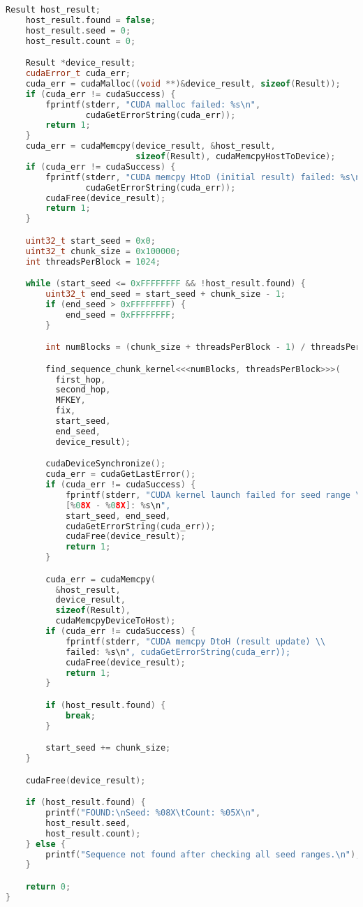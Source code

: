 \begin{lstlisting}[language=C++,basicstyle=\small,showstringspaces=false]
    Result host_result;
    host_result.found = false;
    host_result.seed = 0;
    host_result.count = 0;

    Result *device_result;
    cudaError_t cuda_err;
    cuda_err = cudaMalloc((void **)&device_result, sizeof(Result));
    if (cuda_err != cudaSuccess) {
        fprintf(stderr, "CUDA malloc failed: %s\n",
                cudaGetErrorString(cuda_err));
        return 1;
    }
    cuda_err = cudaMemcpy(device_result, &host_result,
                          sizeof(Result), cudaMemcpyHostToDevice);
    if (cuda_err != cudaSuccess) {
        fprintf(stderr, "CUDA memcpy HtoD (initial result) failed: %s\n",
                cudaGetErrorString(cuda_err));
        cudaFree(device_result);
        return 1;
    }

    uint32_t start_seed = 0x0;
    uint32_t chunk_size = 0x100000;
    int threadsPerBlock = 1024;

    while (start_seed <= 0xFFFFFFFF && !host_result.found) {
        uint32_t end_seed = start_seed + chunk_size - 1;
        if (end_seed > 0xFFFFFFFF) {
            end_seed = 0xFFFFFFFF;
        }

        int numBlocks = (chunk_size + threadsPerBlock - 1) / threadsPerBlock;

        find_sequence_chunk_kernel<<<numBlocks, threadsPerBlock>>>(
          first_hop,
          second_hop,
          MFKEY,
          fix,
          start_seed,
          end_seed,
          device_result);

        cudaDeviceSynchronize();
        cuda_err = cudaGetLastError();
        if (cuda_err != cudaSuccess) {
            fprintf(stderr, "CUDA kernel launch failed for seed range \\
            [%08X - %08X]: %s\n",
            start_seed, end_seed,
            cudaGetErrorString(cuda_err));
            cudaFree(device_result);
            return 1;
        }

        cuda_err = cudaMemcpy(
          &host_result,
          device_result,
          sizeof(Result),
          cudaMemcpyDeviceToHost);
        if (cuda_err != cudaSuccess) {
            fprintf(stderr, "CUDA memcpy DtoH (result update) \\
            failed: %s\n", cudaGetErrorString(cuda_err));
            cudaFree(device_result);
            return 1;
        }

        if (host_result.found) {
            break;
        }

        start_seed += chunk_size;
    }

    cudaFree(device_result);

    if (host_result.found) {
        printf("FOUND:\nSeed: %08X\tCount: %05X\n",
        host_result.seed,
        host_result.count);
    } else {
        printf("Sequence not found after checking all seed ranges.\n");
    }

    return 0;
}
\end{lstlisting}
